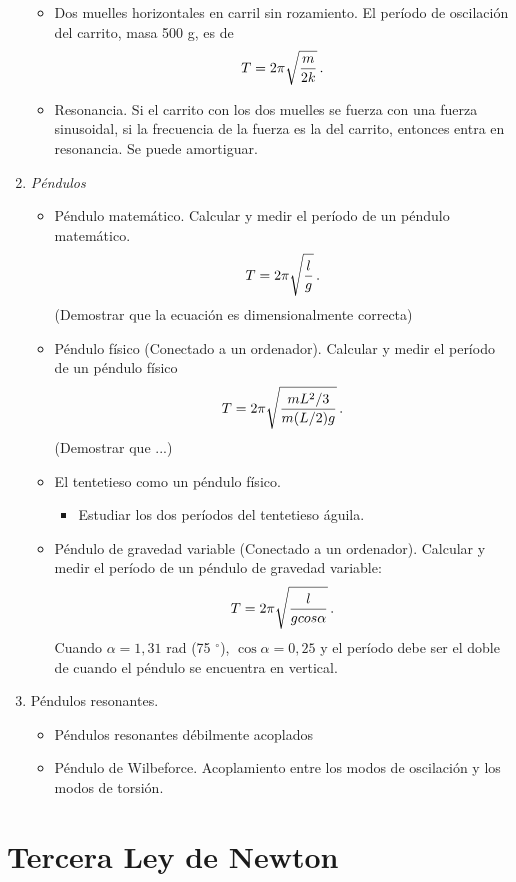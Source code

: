 \documentclass[11pt]{articulo}
\begin{document}
\begin{enumerate}
\begin{itemize}
\item Dos muelles horizontales en carril sin rozamiento.  El per\'iodo de oscilaci\'on del carrito, masa 500 g, es de
$$T = 2 \pi \sqrt{m\over 2k}\, .$$ 

\item Resonancia.  Si el carrito con los dos muelles se fuerza con una fuerza sinusoidal, si la frecuencia de la fuerza es la del carrito, entonces entra en resonancia. Se puede amortiguar. 
\end{itemize}

\item {\it P\'endulos}

  \begin{itemize}
  \item P\'endulo matem\'atico. Calcular y medir el per\'iodo de un p\'endulo matem\'atico. 
$$T = 2 \pi \sqrt{l\over g}\, .$$
(Demostrar que la ecuaci\'on es dimensionalmente correcta)
\item P\'endulo f\'isico (Conectado a un ordenador). Calcular y medir el per\'iodo de un p\'endulo f\'isico
$$T = 2 \pi \sqrt{m L^2/3 \over m (L/2) g}\, .$$
(Demostrar que ...)
\item El tentetieso como un p\'endulo f\'isico. 
  \begin{itemize}
  \item Estudiar los dos per\'iodos del tentetieso \'aguila.
  \end{itemize}
\item P\'endulo de gravedad variable (Conectado a un ordenador).  Calcular y medir el per\'iodo de un p\'endulo de gravedad variable:
$$T = 2 \pi \sqrt{l\over g cos \alpha}\, .$$
  Cuando $\alpha = 1,31$ rad (75 $^\circ$), $\cos \alpha = 0,25$ y el per\'iodo debe ser el doble de cuando el p\'endulo se encuentra en vertical.
\end{itemize}
\item P\'endulos resonantes. 
\begin{itemize}
\item P\'endulos resonantes d\'ebilmente acoplados
\item P\'endulo de Wilbeforce. Acoplamiento entre los modos de oscilaci\'on y los modos de torsi\'on.
\end{itemize}
\end{enumerate}


\section{Tercera Ley de Newton}
\end{document}
